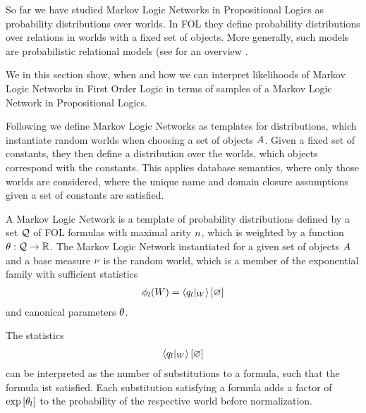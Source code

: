 
So far we have studied Markov Logic Networks in Propositional Logics as probability distributions over worlds.
In FOL they define probability distributions over relations in worlds with a fixed set of objects.
More generally, such models are probabilistic relational models (see for an overview \cite{getoor_introduction_2019}.

%
We in this section show, when and how we can interpret likelihoods of Markov Logic Networks in First Order Logic in terms of samples of a Markov Logic Network in Propositional Logics.


Following \cite{richardson_markov_2006} we define Markov Logic Networks as templates for distributions, which instantiate random worlds when choosing a set of objects $A$.
Given a fixed set of constants, they then define a distribution over the worlds, which objects correspond with the constants. %
This applies database semantics, where only those worlds are considered, where the unique name and domain closure assumptions given a set of constants are satisfied.


\begin{definition}
	A Markov Logic Network is a template of probability distributions defined by a set $\mathcal{Q}$ of FOL formulas with maximal arity $n$, which is weighted by a function $\theta:\mathcal{Q} \rightarrow \mathbb{R}$.
	The Markov Logic Network instantiated for a given set of objects $A$ and a base measure $\nu$ is the random world, which is a member of the exponential family with sufficient statistics
	\begin{align*}
		\sstat_{\selindex}(\dataworld)  = \sbcontraction{\groundingof{\folexformula_\selindex}} %
	\end{align*}
	and canonical parameters $\theta$.
\end{definition}

The statistics
	\begin{align*}
		\sbcontraction{\groundingof{\folexformula_\selindex}} %
	\end{align*}
can be interpreted as the number of substitutions to a formula, such that the formula ist satisfied.
Each substitution satisfying a formula adds a factor of $\mathrm{exp}\left[\theta_l\right]$ to the probability of the respective world before normalization.


